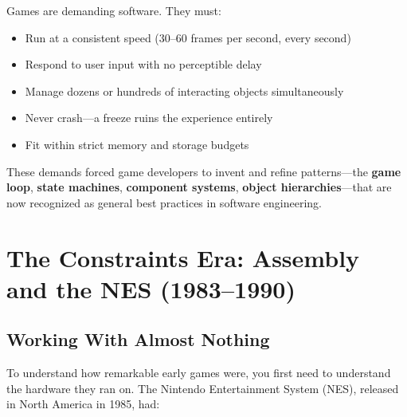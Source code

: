 \documentclass[11pt,letterpaper]{article}
\begin{document}
\begin{conceptbox}
Games are demanding software. They must:
\begin{itemize}[itemsep=2pt]
    \item Run at a consistent speed (30--60 frames per second, every second)
    \item Respond to user input with no perceptible delay
    \item Manage dozens or hundreds of interacting objects simultaneously
    \item Never crash---a freeze ruins the experience entirely
    \item Fit within strict memory and storage budgets
\end{itemize}
These demands forced game developers to invent and refine patterns---the \textbf{game loop}, \textbf{state machines}, \textbf{component systems}, \textbf{object hierarchies}---that are now recognized as general best practices in software engineering.
\end{conceptbox}

\section{The Constraints Era: Assembly and the NES (1983--1990)}

\subsection{Working With Almost Nothing}

To understand how remarkable early games were, you first need to understand the hardware they ran on. The Nintendo Entertainment System (NES), released in North America in 1985, had:

\begin{center}
\end{center}
\end{document}
